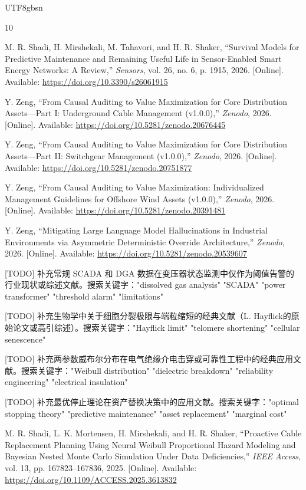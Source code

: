 \documentclass[journal]{IEEEtran}
\begin{document}
\begin{CJK*}{UTF8}{gbsn}
\begin{thebibliography}{10}

M. R. Shadi, H. Mirshekali, M. Tahavori, and H. R. Shaker, ``Survival Models for Predictive Maintenance and Remaining Useful Life in Sensor-Enabled Smart Energy Networks: A Review,'' \textit{Sensors}, vol. 26, no. 6, p. 1915, 2026. [Online]. Available: \url{https://doi.org/10.3390/s26061915}

Y. Zeng, ``From Causal Auditing to Value Maximization for Core Distribution Assets—Part I: Underground Cable Management (v1.0.0),'' \textit{Zenodo}, 2026. [Online]. Available: \url{https://doi.org/10.5281/zenodo.20676445}

Y. Zeng, ``From Causal Auditing to Value Maximization for Core Distribution Assets—Part II: Switchgear Management (v1.0.0),'' \textit{Zenodo}, 2026. [Online]. Available: \url{https://doi.org/10.5281/zenodo.20751877}

Y. Zeng, ``From Causal Auditing to Value Maximization: Individualized Management Guidelines for Offshore Wind Assets (v1.0.0),'' \textit{Zenodo}, 2026. [Online]. Available: \url{https://doi.org/10.5281/zenodo.20391481}

Y. Zeng, ``Mitigating Large Language Model Hallucinations in Industrial Environments via Asymmetric Deterministic Override Architecture,'' \textit{Zenodo}, 2026. [Online]. Available: \url{https://doi.org/10.5281/zenodo.20539607}

[TODO] 补充常规 SCADA 和 DGA 数据在变压器状态监测中仅作为阈值告警的行业现状或综述文献。搜索关键字："dissolved gas analysis" "SCADA" "power transformer" "threshold alarm" "limitations"

[TODO] 补充生物学中关于细胞分裂极限与端粒缩短的经典文献（L. Hayflick的原始论文或高引综述）。搜索关键字："Hayflick limit" "telomere shortening" "cellular senescence"

[TODO] 补充两参数威布尔分布在电气绝缘介电击穿或可靠性工程中的经典应用文献。搜索关键字："Weibull distribution" "dielectric breakdown" "reliability engineering" "electrical insulation"

[TODO] 补充最优停止理论在资产替换决策中的应用文献。搜索关键字："optimal stopping theory" "predictive maintenance" "asset replacement" "marginal cost"

M. R. Shadi, L. K. Mortensen, H. Mirshekali, and H. R. Shaker, ``Proactive Cable Replacement Planning Using Neural Weibull Proportional Hazard Modeling and Bayesian Nested Monte Carlo Simulation Under Data Deficiencies,'' \textit{IEEE Access}, vol. 13, pp. 167823--167836, 2025. [Online]. Available: \url{https://doi.org/10.1109/ACCESS.2025.3613832}


\end{thebibliography}
\end{CJK*}
\end{document}
